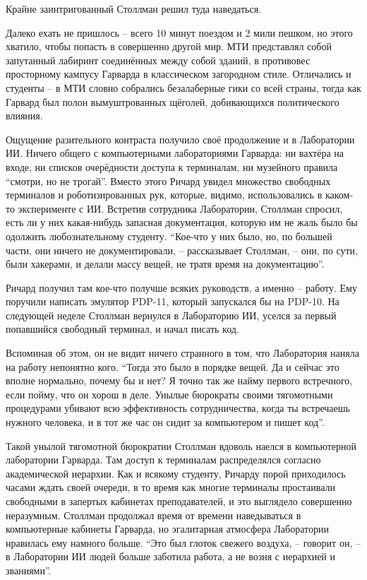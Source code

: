 Крайне заинтригованный Столлман решил туда наведаться.

Далеко ехать не пришлось -- всего 10 минут поездом и 2 мили пешком, но этого хватило, чтобы попасть в совершенно другой мир. МТИ представлял собой запутанный лабиринт соединённых между собой зданий, в противовес просторному кампусу Гарварда в классическом загородном стиле. Отличались и студенты -- в МТИ словно собрались безалаберные гики со всей страны, тогда как Гарвард был полон вымуштрованных щёголей, добивающихся политического влияния.

Ощущение разительного контраста получило своё продолжение и в Лаборатории ИИ. Ничего общего с компьютерными лабораториями Гарварда: ни вахтёра на входе, ни списков очерёдности доступа к терминалам, ни музейного правила \enquote{смотри, но не трогай}. Вместо этого Ричард увидел множество свободных терминалов и роботизированных рук, которые, видимо, использовались в каком-то эксперименте с ИИ. Встретив сотрудника Лаборатории, Столлман спросил, есть ли у них какая-нибудь запасная документация, которую им не жаль было бы одолжить любознательному студенту. \enquote{Кое-что у них было, но, по большей части, они ничего не документировали, -- рассказывает Столлман, -- они, по сути, были хакерами, и делали массу вещей, не тратя время на документацию}.

Ричард получил там кое-что получше всяких руководств, а именно -- работу. Ему поручили написать эмулятор PDP-11, который запускался бы на PDP-10. На следующей неделе Столлман вернулся в Лабораторию ИИ, уселся за первый попавшийся свободный терминал, и начал писать код.

Вспоминая об этом, он не видит ничего странного в том, что Лаборатория наняла на работу непонятно кого. \enquote{Тогда это было в порядке вещей. Да и сейчас это вполне нормально, почему бы и нет? Я точно так же найму первого встречного, если пойму, что он хорош в деле. Унылые бюрократы своими тягомотными процедурами убивают всю эффективность сотрудничества, когда ты встречаешь нужного человека, и в тот же час он сидит за компьютером и пишет код}.

Такой унылой тягомотной бюрократии Столлман вдоволь наелся в компьютерной лаборатории Гарварда. Там доступ к терминалам распределялся согласно академической иерархии. Как и всякому студенту, Ричарду порой приходилось часами ждать своей очереди, в то время как многие терминалы простаивали свободными в запертых кабинетах преподавателей, и это выглядело совершенно неразумным. Столлман продолжал время от времени наведываться в компьютерные кабинеты Гарварда, но эгалитарная атмосфера Лаборатории нравилась ему намного больше. \enquote{Это был глоток свежего воздуха, -- говорит он, -- в Лаборатории ИИ людей больше заботила работа, а не возня с иерархией и званиями}.

